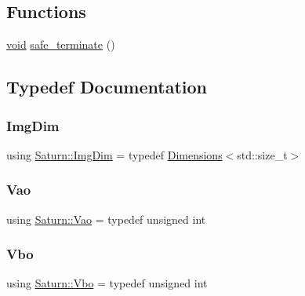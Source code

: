 \subsection*{Functions}
\begin{DoxyCompactItemize}
\item 
\mbox{\hyperlink{glad_8h_a950fc91edb4504f62f1c577bf4727c29}{void}} \mbox{\hyperlink{namespace_saturn_a346560f8ef54f5cb2c0e72fff5057c8f}{safe\+\_\+terminate}} ()
\end{DoxyCompactItemize}


\subsection{Typedef Documentation}
\mbox{\label{namespace_saturn_a8bd2b855a967447c8314c235470e0987}} 
\subsubsection{\texorpdfstring{Img\+Dim}{ImgDim}}
{\footnotesize\ttfamily using \mbox{\hyperlink{namespace_saturn_a8bd2b855a967447c8314c235470e0987}{Saturn\+::\+Img\+Dim}} = typedef \mbox{\hyperlink{struct_saturn_1_1_dimensions}{Dimensions}}$<$std\+::size\+\_\+t$>$}

\mbox{\label{namespace_saturn_addda149ffd4b4d713a0da05381dd1855}} 
\subsubsection{\texorpdfstring{Vao}{Vao}}
{\footnotesize\ttfamily using \mbox{\hyperlink{namespace_saturn_addda149ffd4b4d713a0da05381dd1855}{Saturn\+::\+Vao}} = typedef unsigned int}

\mbox{\label{namespace_saturn_aab7e2d9f83adaea6d8ca8151d1d8b490}} 
\subsubsection{\texorpdfstring{Vbo}{Vbo}}
{\footnotesize\ttfamily using \mbox{\hyperlink{namespace_saturn_aab7e2d9f83adaea6d8ca8151d1d8b490}{Saturn\+::\+Vbo}} = typedef unsigned int}

